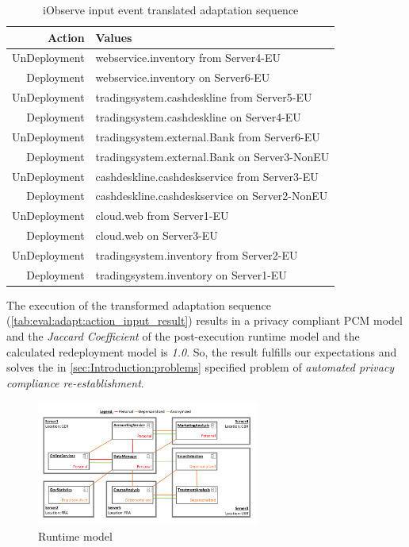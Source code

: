 \begin{table}[h]
	\centering
	\begin{tabular}{r | l}
		\hline
		\textbf{Action} & \textbf{Values}\\
		\hline
		UnDeployment & webservice.inventory from Server4-EU\\
		Deployment & webservice.inventory on Server6-EU\\
		
		UnDeployment & tradingsystem.cashdeskline from Server5-EU\\
		Deployment & tradingsystem.cashdeskline on Server4-EU\\
		
		UnDeployment & tradingsystem.external.Bank from Server6-EU\\
		Deployment & tradingsystem.external.Bank on Server3-NonEU\\
		
		UnDeployment & cashdeskline.cashdeskservice from Server3-EU\\
		Deployment & cashdeskline.cashdeskservice on Server2-NonEU\\
		
		UnDeployment & cloud.web from Server1-EU\\
		Deployment & cloud.web on Server3-EU\\
		
		UnDeployment & tradingsystem.inventory from Server2-EU\\
		Deployment & tradingsystem.inventory on Server1-EU\\
		\hline
	\end{tabular}
	\caption{iObserve input event translated adaptation sequence}
	\label{tab:eval:adapt:action_input_result}
\end{table}


The execution of the transformed adaptation sequence (\autoref{tab:eval:adapt:action_input_result}) results in a privacy compliant PCM model and the \textit{Jaccard Coefficient} of the post-execution runtime model and the calculated redeployment model is \textit{1.0}. So, the result fulfills our expectations and solves the in \autoref{sec:Introduction:problems} specified problem of \textit{automated privacy compliance re-establishment}.

\begin{figure}[h]
	\centering
	\includegraphics[trim = 5mm 10mm 10mm 10mm, clip, width=0.65\textwidth]{graphs/medSystem_adap_calc_all_runtime}
	\caption{Runtime model}
	\label{fig:eval:adapt:4:run}
\end{figure}


